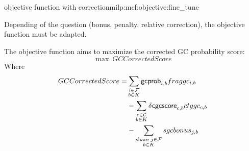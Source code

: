 \begin{definition}{\MGC{} objective function with correction}{milp:mcf:objective:fine_tune}
  \begin{fixmebox}
    Depending of the question (bonus, penalty, relative correction), the objective function must be adapted.
  \end{fixmebox}
  The objective function aims to maximize the corrected GC probability score:
  \begin{equation}
    \max ~ GCCorrectedScore
  \end{equation}
  Where
  \begin{align}
    \begin{split}
      GCCorrectedScore = & \sum_{\substack{
          i \in \mathcal{F}{} \\
          b \in K
      }} \mathsf{gcprob}_{i, b} fraggc_{i,b} \\
      & - \sum_{\substack{
          c \in \mathcal{C}{} \\
          b \in K
      }} \mathsf{\delta cgcscore}_{c, b}ctggc_{c,b} \\
      & - \sum_{\substack{
          \text{share } j \in \mathcal{F}{} \\
          b \in K
      }} sgcbonus_{j, b}
    \end{split}
  \end{align}
\end{definition}
